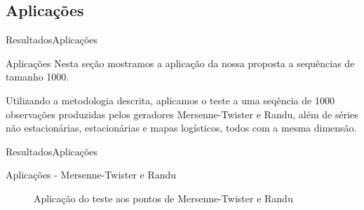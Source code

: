 \documentclass[10pt,xcolor={dvipsnames}]{beamer}
\begin{document}
\subsection{Aplicações}
\begin{frame}{Resultados}{Aplicações}
	\begin{block}{Aplicações}
		Nesta seção mostramos a aplicação da nossa proposta a sequências de tamanho \num{1000}.
		
		Utilizando a metodologia descrita, aplicamos o teste a uma seqência de \num{1000} observações produzidas pelos geradores Mersenne-Twister e Randu, além de séries não estacionárias, estacionárias e mapas logísticos, todos com a mesma dimensão.
		
	\end{block}
\end{frame}

\begin{frame}{Resultados}{Aplicações}
	\begin{block}{Aplicações - Mersenne-Twister e Randu}
	\begin{figure}
		\centering
		\caption{Aplicação do teste aos pontos de Mersenne-Twister e Randu}\label{fig:ConfInt_PRNGs}
	\end{figure}	
	\end{block}
\end{frame}
\end{document}

